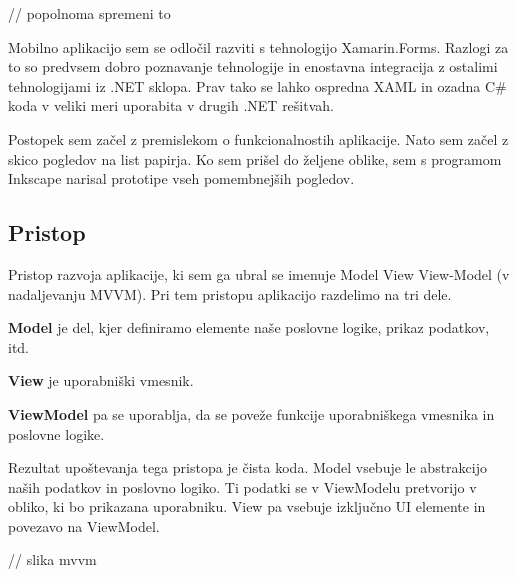 \documentclass[a4paper, 12pt]{book}
\begin{document}
// popolnoma spremeni to

Mobilno aplikacijo sem se odločil razviti s tehnologijo Xamarin.Forms.
Razlogi za to so predvsem dobro poznavanje tehnologije in enostavna integracija z ostalimi tehnologijami iz .NET sklopa.
Prav tako se lahko ospredna XAML in ozadna C\# koda v veliki meri uporabita v drugih .NET rešitvah.

Postopek sem začel z premislekom o funkcionalnostih aplikacije.
Nato sem začel z skico pogledov na list papirja.
Ko sem prišel do željene oblike, sem s programom Inkscape narisal prototipe vseh pomembnejših pogledov.

\subsection{Pristop}
Pristop razvoja aplikacije, ki sem ga ubral se imenuje Model View View-Model (v nadaljevanju MVVM).
Pri tem pristopu aplikacijo razdelimo na tri dele.

\textbf{Model} je del, kjer definiramo elemente naše poslovne logike, prikaz podatkov, itd.

\textbf{View} je uporabniški vmesnik.

\textbf{ViewModel} pa se uporablja, da se poveže funkcije uporabniškega vmesnika in poslovne logike.

Rezultat upoštevanja tega pristopa je čista koda.
Model vsebuje le abstrakcijo naših podatkov in poslovno logiko.
Ti podatki se v ViewModelu pretvorijo v obliko, ki bo prikazana uporabniku.
View pa vsebuje izključno UI elemente in povezavo na ViewModel.

// slika mvvm

% 
% 
% 
% 
% 
\end{document}
